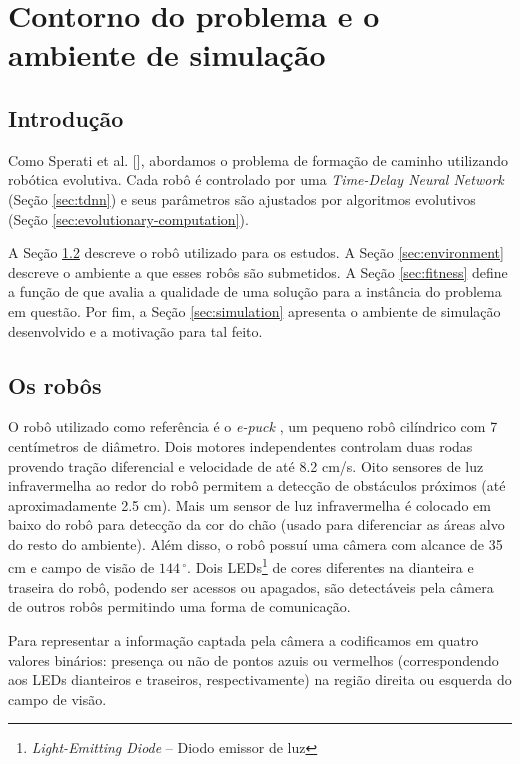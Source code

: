 \chapter{Contorno do problema e o ambiente de simulação}
\label{cha:problem-limits}

\section{Introdução}

Como Sperati et al. [\cite{sperati2011path}], abordamos o problema de formação de caminho utilizando robótica evolutiva. Cada robô é controlado por uma \textit{Time-Delay Neural Network} (Seção \ref{sec:tdnn}) e seus parâmetros são ajustados por algoritmos evolutivos (Seção \ref{sec:evolutionary-computation}).

A Seção \ref{sec:robots} descreve o robô utilizado para os estudos. A Seção \ref{sec:environment} descreve o ambiente a que esses robôs são submetidos. A Seção \ref{sec:fitness} define a função de \fitness que avalia a qualidade de uma solução para a instância do problema em questão. Por fim, a Seção \ref{sec:simulation} apresenta o ambiente de simulação desenvolvido e a motivação para tal feito.

\section{Os robôs}
\label{sec:robots}

O robô utilizado como referência é o \textit{e-puck} \cite{mondada2009epuck}, um pequeno robô cilíndrico com 7 centímetros de diâmetro. Dois motores independentes controlam duas rodas provendo tração diferencial e velocidade de até 8.2 cm/s. Oito sensores de luz infravermelha ao redor do robô permitem a detecção de obstáculos próximos (até aproximadamente 2.5 cm). Mais um sensor de luz infravermelha é colocado em baixo do robô para detecção da cor do chão (usado para diferenciar as áreas alvo do resto do ambiente). Além disso, o robô possuí uma câmera com alcance de 35 cm e campo de visão de $144\,^{\circ}$. Dois LEDs\footnote{\textit{Light-Emitting Diode} -- Diodo emissor de luz} de cores diferentes na dianteira e traseira do robô, podendo ser acessos ou apagados, são detectáveis pela câmera de outros robôs permitindo uma forma de comunicação.

Para representar a informação captada pela câmera a codificamos em quatro valores binários: presença ou não de pontos azuis ou vermelhos (correspondendo aos LEDs dianteiros e traseiros, respectivamente) na região direita ou esquerda do campo de visão.


